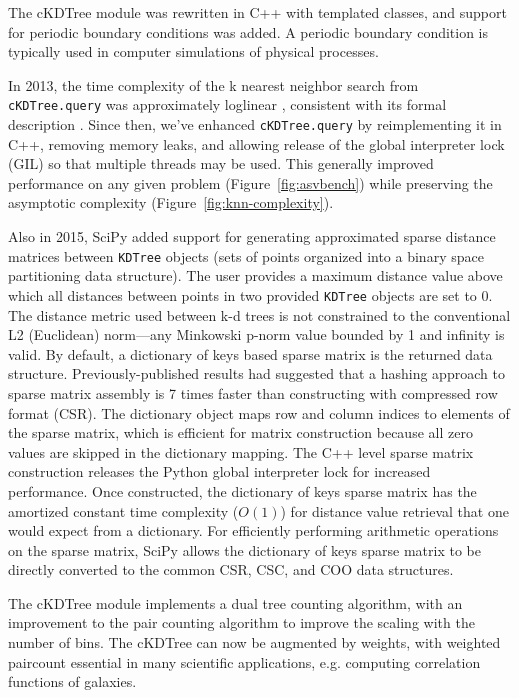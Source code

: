 The cKDTree module was rewritten in C++ with templated classes, and support for
periodic boundary conditions was added. A periodic boundary condition is typically 
used in computer simulations of physical processes.

In 2013, the time complexity of the k nearest neighbor search from
\texttt{cKDTree.query} was approximately loglinear \cite{knn-jake},
consistent with its formal description \cite{kdtree-search-algo}.
Since then, we've enhanced \texttt{cKDTree.query} by reimplementing it in
C++, removing memory leaks, and allowing release of the global interpreter lock (GIL) so that
multiple threads may be used\cite{gh-4374}. This generally improved
performance on any given problem (Figure~\ref{fig:asvbench}) while
preserving the asymptotic complexity (Figure~\ref{fig:knn-complexity}).

Also in 2015, SciPy added support for generating approximated sparse distance matrices 
between \texttt{KDTree} objects (sets of points organized into a binary space 
partitioning data structure\cite{Bentley:1975:MBS:361002.361007}). 
The user provides a maximum distance value
above which all distances between points in two provided \texttt{KDTree} objects
are set to 0. The distance metric used between k-d trees is not constrained
to the conventional L2 (Euclidean) norm---any Minkowski p-norm value
bounded by 1 and infinity is valid. By default, a dictionary of keys
based sparse matrix is the returned data structure. Previously-published
results had suggested that a hashing approach to sparse matrix assembly
is 7 times faster than constructing with compressed row format (CSR)\cite{10.1007/978-3-540-75755-9_107}.
The dictionary object maps row and column indices to elements of the sparse matrix, which is
efficient for matrix construction because all zero values are skipped in
the dictionary mapping. The C++ level sparse matrix construction releases the Python
global interpreter lock for increased performance. Once constructed, the
dictionary of keys sparse matrix has the amortized constant time complexity 
($O(1)$) for distance value retrieval that one would expect from a 
dictionary\cite{Cormen:2001:IA:580470}. For efficiently performing arithmetic
operations on the sparse matrix, SciPy allows the dictionary of keys
sparse matrix to be directly converted to the common CSR, CSC, and COO
data structures.

The cKDTree module implements a dual tree counting algorithm\cite{Moore2000ar},
with an improvement to the pair counting algorithm to improve the scaling
with the number of bins. The cKDTree can now be augmented by weights, with 
weighted paircount essential in many scientific applications, e.g. computing 
correlation functions of galaxies\cite{0004-637X-750-1-38}.

